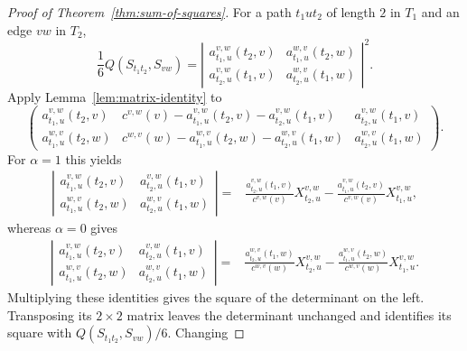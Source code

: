\documentclass[12pt]{article}
\begin{document}
\begin{proof}[Proof of Theorem~\ref{thm:sum-of-squares}]
For a path $t_1ut_2$ of length $2$ in $T_1$ and an edge $vw$ in $T_2$,
\begin{equation}\label{eq:display-033}
\frac16Q(S_{t_1t_2},S_{vw})=
\left|
\begin{matrix}
a_{t_1,u}^{v,w}(t_2,v)&a_{t_1,u}^{w,v}(t_2,w)\\
a_{t_2,u}^{v,w}(t_1,v)&a_{t_2,u}^{w,v}(t_1,w)
\end{matrix}
\right|^2.
\end{equation}
Apply Lemma~\ref{lem:matrix-identity} to
\begingroup
\small
\setlength{\arraycolsep}{12pt}
\renewcommand{\arraystretch}{1.12}
\begin{equation}\label{eq:display-034}
\begin{pmatrix}
a_{t_1,u}^{v,w}(t_2,v)&
c^{v,w}(v)-a_{t_1,u}^{v,w}(t_2,v)-a_{t_2,u}^{v,w}(t_1,v)&
a_{t_2,u}^{v,w}(t_1,v)\\
a_{t_1,u}^{w,v}(t_2,w)&
c^{w,v}(w)-a_{t_1,u}^{w,v}(t_2,w)-a_{t_2,u}^{w,v}(t_1,w)&
a_{t_2,u}^{w,v}(t_1,w)
\end{pmatrix}.
\end{equation}
\endgroup
For $\alpha=1$ this yields
\begin{equation}\label{eq:display-035}
\begin{aligned}
\left|
\begin{matrix}
a_{t_1,u}^{v,w}(t_2,v)&a_{t_2,u}^{v,w}(t_1,v)\\
a_{t_1,u}^{w,v}(t_2,w)&a_{t_2,u}^{w,v}(t_1,w)
\end{matrix}
\right|
={}&\frac{a_{t_2,u}^{v,w}(t_1,v)}{c^{v,w}(v)}X_{t_2,u}^{v,w}
-\frac{a_{t_1,u}^{v,w}(t_2,v)}{c^{v,w}(v)}X_{t_1,u}^{v,w},
\end{aligned}
\end{equation}
whereas $\alpha=0$ gives
\begin{equation}\label{eq:display-036}
\begin{aligned}
\left|
\begin{matrix}
a_{t_1,u}^{v,w}(t_2,v)&a_{t_2,u}^{v,w}(t_1,v)\\
a_{t_1,u}^{w,v}(t_2,w)&a_{t_2,u}^{w,v}(t_1,w)
\end{matrix}
\right|
={}&\frac{a_{t_2,u}^{w,v}(t_1,w)}{c^{w,v}(w)}X_{t_2,u}^{v,w}
-\frac{a_{t_1,u}^{w,v}(t_2,w)}{c^{w,v}(w)}X_{t_1,u}^{v,w}.
\end{aligned}
\end{equation}
Multiplying these identities gives the square of the determinant on the
left.  Transposing its $2\times2$ matrix leaves the determinant unchanged
and identifies its square with $Q(S_{t_1t_2},S_{vw})/6$.  Changing

\end{proof}
\end{document}
